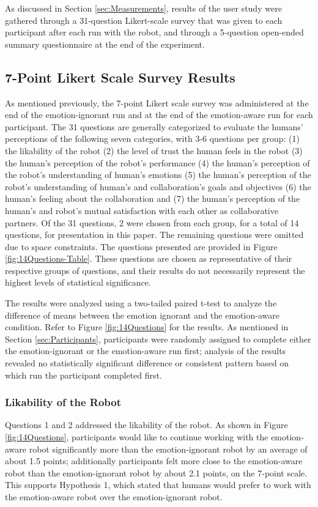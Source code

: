 \documentclass[12pt]{report}
\begin{document}
As discussed in Section \ref{sec:Measurements}, results of the user study were
gathered through a 31-question Likert-scale survey that was given to each participant
after each run with the robot, and through a 5-question open-ended summary
questionnaire at the end of the experiment.

\subsection{7-Point Likert Scale Survey Results}
As mentioned previously, the 7-point Likert scale survey was administered at
the end of the emotion-ignorant run and at the end of the emotion-aware run for
each participant. The 31 questions are generally categorized to evaluate the
humans' perceptions of the following seven categories, with 3-6 questions per
group: (1) the likability of the robot (2) the level of trust the human feels
in the robot (3) the human's perception of the robot's performance (4) the
human's perception of the robot's understanding of human's emotions (5) the
human's perception of the robot's understanding of human's and collaboration's
goals and objectives (6) the human's feeling about the collaboration and (7)
the human's perception of the human's and robot's mutual satisfaction with each
other as collaborative partners. Of the 31 questions, 2 were chosen from each
group, for a total of 14 questions, for presentation in this paper. The
remaining questions were omitted due to space constraints. The questions
presented are provided in Figure \ref{fig:14Questions-Table}. These questions
are chosen as representative of their respective groups of questions, and their
results do not necessarily represent the highest levels of statistical
significance.

The results were analyzed using a two-tailed paired t-test to analyze the
difference of means between the emotion ignorant and the emotion-aware
condition. Refer to Figure \ref{fig:14Questions} for the results. As mentioned
in Section \ref{sec:Participants}, participants were randomly assigned to complete
either the emotion-ignorant or the emotion-aware run first; analysis of the
results revealed no statistically significant difference or consistent pattern
based on which run the participant completed first.

\vspace*{-3mm}
\subsubsection{Likability of the Robot}
\label{sec:Likability}
Questions 1 and 2 addressed the likability of the robot. As shown in Figure
\ref{fig:14Questions}, participants would like to continue working with the emotion-aware
robot significantly more than the emotion-ignorant robot by an average of about 1.5
points; additionally participants felt more close to the emotion-aware robot
than the emotion-ignorant robot by about 2.1 points, on the 7-point scale. This
supports Hypothesis 1, which stated that humans would prefer to work with the
emotion-aware robot over the emotion-ignorant robot.
\end{document}
